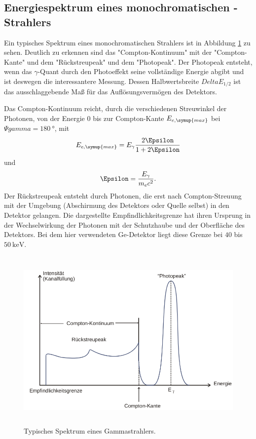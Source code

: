 \subsection{Energiespektrum eines monochromatischen \texorpdfstring{\gamma-}{gamma}Strahlers}
Ein typisches Spektrum eines monochromatischen Strahlers ist in Abbildung \ref{fig:Spektrum} zu sehen.
Deutlich zu erkennen sind das "Compton-Kontinuum" mit der "Compton-Kante" und dem "Rückstreupeak" und dem "Photopeak".
Der Photopeak entsteht, wenn das $\gamma$-Quant durch den Photoeffekt seine vollständige Energie abgibt und ist deswegen die interessantere Messung.
Dessen Halbwertsbreite $Delta E_{1/2}$ ist das ausschlaggebende Maß für das Auflösungsvermögen des Detektors.

Das Compton-Kontinuum reicht, durch die verschiedenen Streuwinkel der Photonen, von der Energie 0 bis zur Compton-Kante $E_{e,\symup{max}}$ bei $\Psi{gamma}=\SI{180}{\degree}$, mit
\begin{equation*}
E_{e,\symup{max}}=E_{\gamma}\frac{2\Epsilon}{1+2\Epsilon}
\end{equation*}
und
\begin{equation*}
\Epsilon = \frac{E_{\gamma}}{m_e c^2}.
\end{equation*}
Der Rückstreupeak entsteht durch Photonen, die erst nach Compton-Streuung mit der Umgebung (Abschirmung des Detektors oder Quelle selbst) in den Detektor gelangen.
Die dargestellte Empfindlichkeitsgrenze hat ihren Ursprung in der Wechselwirkung der Photonen mit der Schutzhaube und der Oberfläche des Detektors.
Bei dem hier verwendeten Ge-Detektor liegt diese Grenze bei $40$ bis $\SI{50}{\kilo\electronvolt}$.
 \begin{figure}
   \centering
   \includegraphics[height=9cm]{content/Spektrum.png}
   \caption{Typisches Spektrum eines Gammastrahlers.\cite{V18}}
   \label{fig:Spektrum}
 \end{figure}
